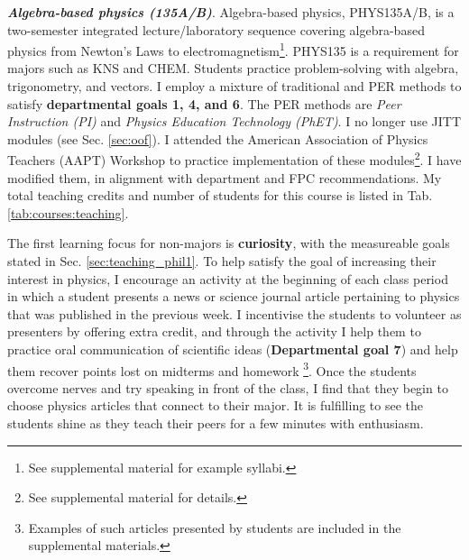 \documentclass[../../../main.tex]{subfiles}
\begin{document}
\textbf{\textit{Algebra-based physics (135A/B)}}. Algebra-based physics, PHYS135A/B, is a two-semester integrated lecture/laboratory sequence covering algebra-based physics from Newton's Laws to electromagnetism\footnote{See supplemental material for example syllabi.}.  PHYS135 is a  requirement for majors such as KNS and CHEM.  Students practice problem-solving with algebra, trigonometry, and vectors.  I employ a mixture of traditional and PER methods to satisfy \textbf{departmental goals 1, 4, and 6}.  The PER methods are \textit{Peer Instruction (PI)} and \textit{Physics Education Technology (PhET)}.  I no longer use JITT modules (see Sec. \ref{sec:oof}).  I attended the American Association of Physics Teachers (AAPT) Workshop to practice implementation of these modules\footnote{See supplemental material for details.}.  I have modified them, in alignment with department and FPC recommendations.  My total teaching credits and number of students for this course is listed in Tab. \ref{tab:courses:teaching}.  \\ \hspace{0.1cm}

The first learning focus for non-majors is \textbf{curiosity}, with the measureable goals stated in Sec. \ref{sec:teaching_phil1}.  To help satisfy the goal of increasing their interest in physics, I encourage an activity at the beginning of each class period in which a student presents a news or science journal article pertaining to physics that was published in the previous week.  I incentivise the students to volunteer as presenters by offering extra credit, and through the activity I help them to practice oral communication of scientific ideas (\textbf{Departmental goal 7}) and help them recover points lost on midterms and homework \footnote{Examples of such articles presented by students are included in the supplemental materials.}.  Once the students overcome nerves and try speaking in front of the class, I find that they begin to choose physics articles that connect to their major.  It is fulfilling to see the students shine as they teach their peers for a few minutes with enthusiasm.  \\ \hspace{0.1cm}
\end{document}
